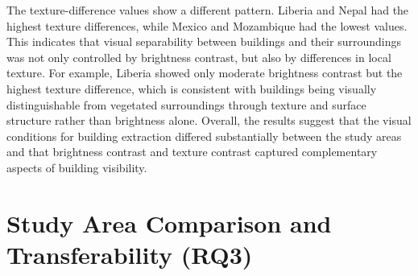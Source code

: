 The texture-difference values show a different pattern. Liberia and Nepal had the highest texture differences, while Mexico and Mozambique had the lowest values. This indicates that visual separability between buildings and their surroundings was not only controlled by brightness contrast, but also by differences in local texture. For example, Liberia showed only moderate brightness contrast but the highest texture difference, which is consistent with buildings being visually distinguishable from vegetated surroundings through texture and surface structure rather than brightness alone. Overall, the results suggest that the visual conditions for building extraction differed substantially between the study areas and that brightness contrast and texture contrast captured complementary aspects of building visibility.


\section{Study Area Comparison and Transferability (RQ3)}
\label{sec:results_study_area_comparison}

